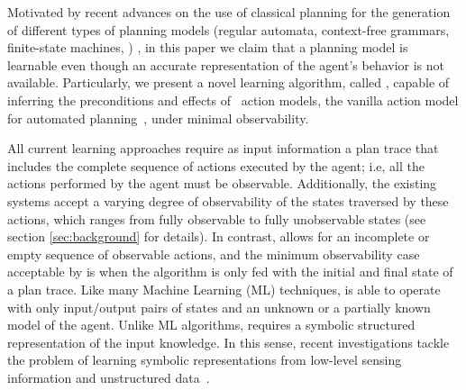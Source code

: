 \textcolor[rgb]{1.00,0.00,0.00}{Motivated by recent advances on the use of classical planning for the generation of different types of planning models (regular automata, context-free grammars, finite-state machines, \strips)} \cite{bonet2009automatic,segovia2016generalized,segovia2016hierarchical,segovia2017generating}, in this paper we claim that a planning model is learnable even though an accurate representation of the agent's behavior is not available. Particularly, we present a novel learning algorithm, called \FAMA, capable of inferring the preconditions and effects of \strips\ action models, the vanilla action model for automated planning~\cite{fikes1971strips}, under minimal observability.


\textcolor[rgb]{1.00,0.00,0.00}{All current learning approaches require as input information a plan trace that includes the complete sequence of actions executed by the agent; i.e, all the actions performed by the agent must be observable. Additionally, the existing systems accept a varying degree of observability of the states traversed by these actions, which ranges from fully observable to fully unobservable states (see section \ref{sec:background} for details)}. In contrast, \FAMA allows for an incomplete or empty sequence of observable actions, and the minimum observability case acceptable by \FAMA is when the algorithm is only fed with the initial and final state of a plan trace. Like many Machine Learning (ML) techniques, \FAMA is able to operate with only input/output pairs of states and an unknown or a partially known model of the agent. Unlike ML algorithms, \FAMA requires a symbolic structured representation of the input knowledge. In this sense, recent investigations tackle the problem of learning symbolic representations from low-level sensing information and unstructured data~\cite{KonidarisKL18,AsaiF18}.

